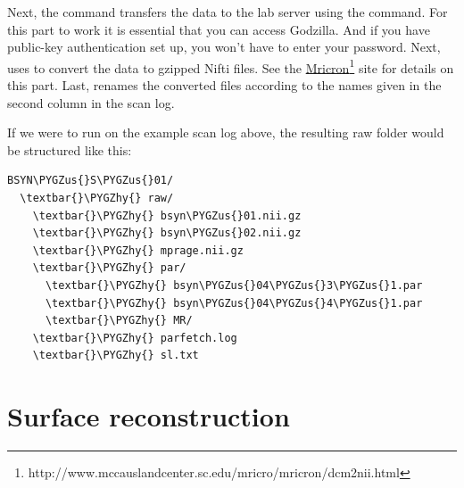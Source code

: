 \documentclass[letterpaper,10pt,openany,oneside]{sphinxmanual}
\def\PYGZus{\char`\_}
\def\PYGZhy{\char`\-}
\begin{document}
Next, the command transfers the data to the lab server using the 
command. For this part to work it is essential that you can access Godzilla.
And if you have public-key authentication set up, you won't have to enter your
password. Next,  uses  to convert the data to gzipped
Nifti files. See the \href{http://www.mccauslandcenter.sc.edu/mricro/mricron/dcm2nii.html}{Mricron}\footnote{http://www.mccauslandcenter.sc.edu/mricro/mricron/dcm2nii.html} site for details on this part. Last, 
renames the converted files according to the names given in the second column
in the scan log.

If we were to run  on the example scan log above, the resulting raw
folder would be structured like this:

\begin{Verbatim}[commandchars=\\\{\}]
BSYN\PYGZus{}S\PYGZus{}01/
  \textbar{}\PYGZhy{} raw/
    \textbar{}\PYGZhy{} bsyn\PYGZus{}01.nii.gz
    \textbar{}\PYGZhy{} bsyn\PYGZus{}02.nii.gz
    \textbar{}\PYGZhy{} mprage.nii.gz
    \textbar{}\PYGZhy{} par/
      \textbar{}\PYGZhy{} bsyn\PYGZus{}04\PYGZus{}3\PYGZus{}1.par
      \textbar{}\PYGZhy{} bsyn\PYGZus{}04\PYGZus{}4\PYGZus{}1.par
      \textbar{}\PYGZhy{} MR/
    \textbar{}\PYGZhy{} parfetch.log
    \textbar{}\PYGZhy{} sl.txt
\end{Verbatim}


\chapter{Surface reconstruction}
\label{surface_reconstruction:surface-reconstruction}\label{surface_reconstruction::doc}\label{surface_reconstruction:mricron}
\end{document}
